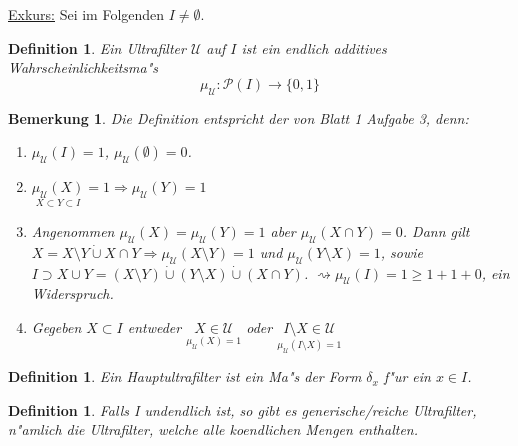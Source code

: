 \documentclass[a4paper,12pt,numbers=noenddot,parskip=full]{scrartcl}
\newcommand{\scrU}{\mathcal{U}}
\newcommand{\scrP}{\mathcal{P}}
\newcommand{\heading}{\underline}
\theoremstyle{dotless}
\newtheorem{definition}[theorem]{Definition}
\newtheorem{remark}[theorem]{Bemerkung}
\begin{document}
	\heading{Exkurs:} Sei im Folgenden $I \ne \emptyset$.
	\begin{definition}
		Ein Ultrafilter $\scrU$ auf $I$ ist ein endlich additives Wahrscheinlichkeitsma"s
		\begin{equation*}
			\mu_\scrU : \scrP(I) \longrightarrow \{0,1\}
		\end{equation*}
	\end{definition}
	\begin{remark}
		Die Definition entspricht der von Blatt 1 Aufgabe 3, denn:
		\begin{enumerate}
			\item $\mu_\scrU(I)=1$, $\mu_\scrU(\emptyset)=0$.
			\item $\underset{X\subset Y \subset I}{\mu_\scrU(X)}=1 \Rightarrow \mu_\scrU(Y)=1$
			\item Angenommen $\mu_\scrU(X)=\mu_\scrU(Y) = 1$ aber $\mu_\scrU(X \cap Y) = 0$. Dann gilt $X = X \setminus Y \dot\cup X \cap Y \Rightarrow \mu_\scrU(X \setminus Y) = 1$ und $\mu_\scrU(Y \setminus X) =1$, sowie $I \supset X \cup Y = (X \setminus Y) \dot\cup (Y\setminus X) \dot\cup (X \cap Y)$. $\rightsquigarrow \mu_\scrU(I)= 1 \geq 1+1+0$, ein Widerspruch.
			\item Gegeben $X \subset I$ entweder $\underset{\mu_\scrU(X)=1}{X \in \scrU}$ oder $\underset{\mu_\scrU(I\setminus X)=1}{I\setminus X \in \scrU}$
		\end{enumerate}
	\end{remark}
	
	\begin{definition}
		Ein Hauptultrafilter ist ein Ma"s der Form $\delta_x$ f"ur ein $x \in I$.
	\end{definition}

	\begin{definition}
		Falls I undendlich ist, so gibt es generische/reiche Ultrafilter, n"amlich die Ultrafilter, welche alle koendlichen Mengen enthalten.
	\end{definition}
\end{document}
